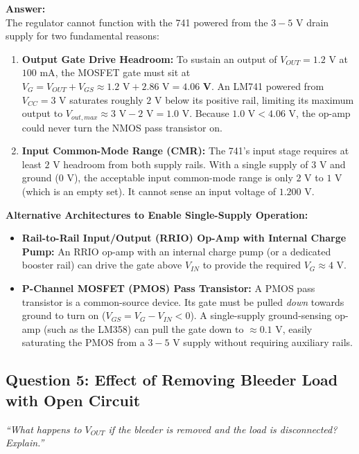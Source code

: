 \documentclass[11pt,a4paper]{article}
\begin{document}
\textbf{Answer:}\\
The regulator cannot function with the 741 powered from the $3 - 5\text{ V}$ drain supply for two fundamental reasons:
\begin{enumerate}
    \item \textbf{Output Gate Drive Headroom:} To sustain an output of $V_{OUT} = 1.2\text{ V}$ at $100\text{ mA}$, the MOSFET gate must sit at $V_G = V_{OUT} + V_{GS} \approx 1.2\text{ V} + 2.86\text{ V} = \mathbf{4.06\text{ V}}$. An LM741 powered from $V_{CC} = 3\text{ V}$ saturates roughly $2\text{ V}$ below its positive rail, limiting its maximum output to $V_{out,max} \approx 3\text{ V} - 2\text{ V} = 1.0\text{ V}$. Because $1.0\text{ V} < 4.06\text{ V}$, the op-amp could never turn the NMOS pass transistor on.
    \item \textbf{Input Common-Mode Range (CMR):} The 741's input stage requires at least $2\text{ V}$ headroom from both supply rails. With a single supply of $3\text{ V}$ and ground ($0\text{ V}$), the acceptable input common-mode range is only $2\text{ V}$ to $1\text{ V}$ (which is an empty set). It cannot sense an input voltage of $1.200\text{ V}$.
\end{enumerate}
\textbf{Alternative Architectures to Enable Single-Supply Operation:}
\begin{itemize}
    \item \textbf{Rail-to-Rail Input/Output (RRIO) Op-Amp with Internal Charge Pump:} An RRIO op-amp with an internal charge pump (or a dedicated booster rail) can drive the gate above $V_{IN}$ to provide the required $V_G \approx 4\text{ V}$.
    \item \textbf{P-Channel MOSFET (PMOS) Pass Transistor:} A PMOS pass transistor is a common-source device. Its gate must be pulled \emph{down} towards ground to turn on ($V_{GS} = V_G - V_{IN} < 0$). A single-supply ground-sensing op-amp (such as the LM358) can pull the gate down to $\approx 0.1\text{ V}$, easily saturating the PMOS from a $3 - 5\text{ V}$ supply without requiring auxiliary rails.
\end{itemize}

\subsection{Question 5: Effect of Removing Bleeder Load with Open Circuit}
\textit{``What happens to $V_{OUT}$ if the bleeder is removed and the load is disconnected? Explain.''}
\end{document}
